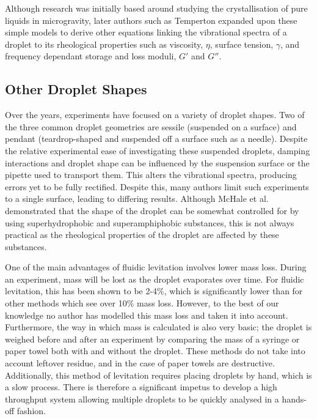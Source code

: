\documentclass{physics_article_B}
\begin{document}
Although research was initially based around studying the crystallisation of pure liquids in microgravity\cite{Wilkes1997}, later authors such as Temperton expanded upon these simple models to derive other equations linking the vibrational spectra of a droplet to its rheological properties such as viscosity, $\eta$, surface tension, $\gamma$, and frequency dependant storage and loss moduli, $G'$ and $G''$. \\

\subsection{Other Droplet Shapes}

Over the years, experiments have focused on a variety of droplet shapes. Two of the three common droplet geometries are sessile (suspended on a surface)\cite{thesis, background, backholm2017oscillating} and pendant (teardrop-shaped and suspended off a surface such as a needle)\cite{thesis}. Despite the relative experimental ease of investigating these suspended droplets, damping interactions and droplet shape can be influenced by the suspension surface or the pipette used to transport them\cite{sharpscaling}. This alters the vibrational spectra, producing errors yet to be fully rectified\cite{harrold2016rheological}. Despite this, many authors limit such experiments to a single surface\cite{sharpscaling}, leading to differing results. Although McHale et al. demonstrated that the shape of the droplet can be somewhat controlled for by using superhydrophobic and superamphiphobic substances, this is not always practical as the rheological properties of the droplet are affected by these substances.

One of the main advantages of fluidic levitation involves lower mass loss. During an experiment, mass will be lost as the droplet evaporates over time. For fluidic levitation, this has been shown to be 2-4\%, which is significantly lower than for other methods which see over 10\% \cite{harrold2016optovibrometry} mass loss. However, to the best of our knowledge no author has modelled this mass loss and taken it into account. Furthermore, the way in which mass is calculated is also very basic; the droplet is weighed before and after an experiment by comparing the mass of a syringe or paper towel both with and without the droplet. These methods do not take into account leftover residue, and in the case of paper towels are destructive. Additionally, this method of levitation requires placing droplets by hand, which is a slow process. There is therefore a significant impetus to develop a high throughput system allowing multiple droplets to be quickly analysed in a hands-off fashion.\\
\end{document}
